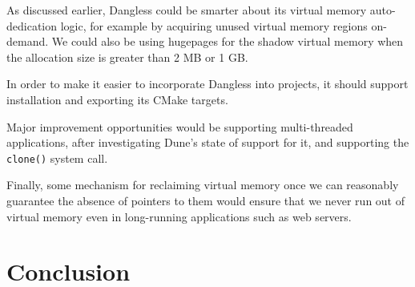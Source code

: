 As discussed earlier, Dangless could be smarter about its virtual memory auto-dedication logic, for example by acquiring unused virtual memory regions on-demand. We could also be using hugepages for the shadow virtual memory when the allocation size is greater than 2 MB or 1 GB.

In order to make it easier to incorporate Dangless into projects, it should support installation and exporting its CMake targets.

Major improvement opportunities would be supporting multi-threaded applications, after investigating Dune's state of support for it, and supporting the \lstinline!clone()! system call.

Finally, some mechanism for reclaiming virtual memory once we can reasonably guarantee the absence of pointers to them would ensure that we never run out of virtual memory even in long-running applications such as web servers.

\section{Conclusion}

